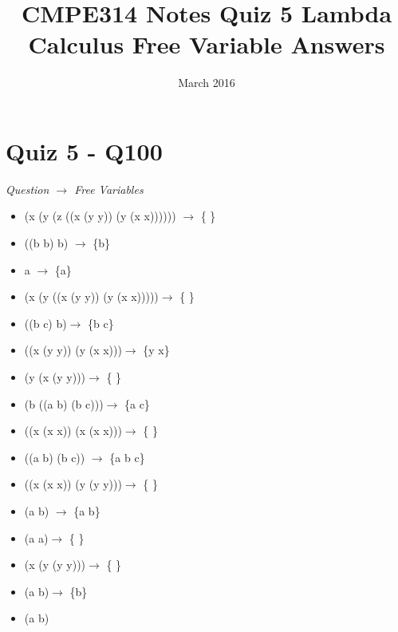 \documentclass{article}
\title{CMPE314 Notes Quiz 5 Lambda Calculus Free Variable Answers}
\date{March 2016}
\begin{document}
\maketitle

\section{Quiz 5 - Q100}
\textit{Question $\rightarrow$ Free Variables}

 \begin{itemize}
	\item (\textlambda x (\textlambda y (\textlambda z ((\textlambda x (y y)) (\textlambda y (x x)))))) $\rightarrow$ \{ \}
	\item ((\textlambda b b) b) $\rightarrow$ \{b\}
	\item a $\rightarrow$ \{a\}
	\item (\textlambda x (\textlambda y ((\textlambda x (y y)) (\textlambda y (x x)))))$\rightarrow$ \{ \}
	\item ((\textlambda b c) b)$\rightarrow$ \{b c\}
	\item ((\textlambda x (y y)) (\textlambda y (x x)))$\rightarrow$ \{y x\}
	\item (\textlambda y (\textlambda x (y y)))$\rightarrow$ \{ \}
	\item (\textlambda b ((a b) (b c)))$\rightarrow$ \{a c\}
	\item ((\textlambda x (x x)) (\textlambda x (x x)))$\rightarrow$ \{ \}
	\item ((a b) (b c)) $\rightarrow$ \{a b c\}
	\item ((\textlambda x (x x)) (\textlambda y (y y)))$\rightarrow$ \{ \}
	\item (a b) $\rightarrow$ \{a b\}
	\item (\textlambda a a)$\rightarrow$ \{ \}
	\item (\textlambda x (\textlambda y (y y)))$\rightarrow$ \{ \}
	\item (\textlambda a b)$\rightarrow$ \{b\}
	\item (\textlambda  a b)
 \end{itemize}
 
 
\end{document}
